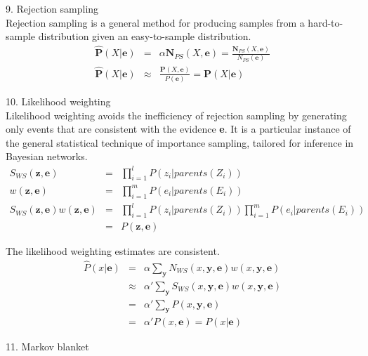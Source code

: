 \documentclass[12pt]{article}
\begin{document}
9. Rejection sampling \\

Rejection sampling is a general method for producing samples from a hard-to-sample distribution given an easy-to-sample distribution.
\begin{eqnarray*}
  \hat{\boldsymbol{P}}(X|\boldsymbol{e})
  &=& \alpha \boldsymbol{N}_{PS}(X, \boldsymbol{e})
  = \frac {\boldsymbol{N}_{PS}(X, \boldsymbol{e})}
          {N_{PS}(\boldsymbol{e})} \\
  \hat{\boldsymbol{P}}(X|\boldsymbol{e})
  &\approx& \frac {\boldsymbol{P}(X, \boldsymbol{e})}
                  {P(\boldsymbol{e})}
  = \boldsymbol{P}(X | \boldsymbol{e})
\end{eqnarray*}

10. Likelihood weighting \\

Likelihood weighting avoids the inefficiency of rejection sampling by generating only events that are consistent with the evidence {\bf e}. It is a particular instance of the general statistical technique of importance sampling, tailored for inference in Bayesian networks.
\begin{eqnarray*}
S_{WS}(\boldsymbol{z}, \boldsymbol{e})
&=& \prod^l_{i=1} P(z_i | parents(Z_i)) \\
w(\boldsymbol{z}, \boldsymbol{e})
&=& \prod^m_{i=1} P(e_i | parents(E_i)) \\
S_{WS}(\boldsymbol{z}, \boldsymbol{e}) w(\boldsymbol{z}, \boldsymbol{e})
&=& \prod^l_{i=1} P(z_i | parents(Z_i)) \prod^m_{i=1} P(e_i | parents(E_i)) \\
&=& P(\boldsymbol{z}, \boldsymbol{e})
\end{eqnarray*}

The likelihood weighting estimates are consistent.
\begin{eqnarray*}
\hat{P}(x | \boldsymbol{e})
&=& \alpha \sum_{\boldsymbol{y}} N_{WS}(x, \boldsymbol{y}, \boldsymbol{e})
    w(x, \boldsymbol{\boldsymbol{y}}, \boldsymbol{e}) \\
&\approx& \alpha' \sum_{\boldsymbol{y}} S_{WS}(x, \boldsymbol{y}, \boldsymbol{e})
          w(x, \boldsymbol{y}, \boldsymbol{e}) \\
&=& \alpha' \sum_{\boldsymbol{y}} P(x, \boldsymbol{y}, \boldsymbol{e}) \\
&=& \alpha' P(x, \boldsymbol{e}) = P(x | \boldsymbol{e})
\end{eqnarray*}

11. Markov blanket \\
\end{document}
